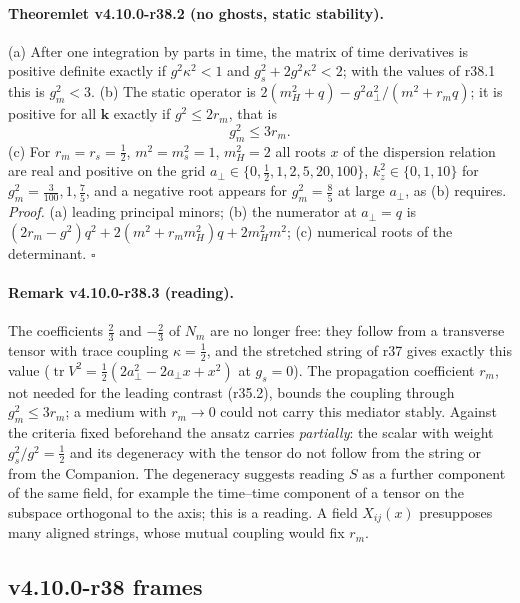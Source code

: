 \paragraph{Theoremlet v4.10.0-r38.2 (no ghosts, static stability).}
(a) After one integration by parts in time, the matrix of time derivatives is positive definite exactly if \(g^2\kappa^2<1\) and
\(g_s^2+2g^2\kappa^2<2\); with the values of r38.1 this is \(g_m^2<3\).
(b) The static operator is \(2(m_H^2+q)-g^2a_\perp^2/(m^2+r_mq)\); it is positive for all \(\mathbf k\) exactly if \(g^2\le2r_m\), that is
\[
 g_m^2\le3r_m .
\]
(c) For \(r_m=r_s=\tfrac12\), \(m^2=m_s^2=1\), \(m_H^2=2\) all roots \(x\) of the dispersion relation are real and positive on the grid
\(a_\perp\in\{0,\tfrac12,1,2,5,20,100\}\), \(k_z^2\in\{0,1,10\}\) for \(g_m^2=\tfrac3{100},1,\tfrac75\), and a negative root appears for \(g_m^2=\tfrac85\) at large
\(a_\perp\), as (b) requires.  \emph{Proof.} (a) leading principal minors; (b) the numerator at \(a_\perp=q\) is
\((2r_m-g^2)q^2+2(m^2+r_mm_H^2)q+2m_H^2m^2\); (c) numerical roots of the determinant.  \(\square\)

\paragraph{Remark v4.10.0-r38.3 (reading).}
The coefficients \(\tfrac23\) and \(-\tfrac23\) of \(N_m\) are no longer free: they follow from a transverse tensor with trace coupling \(\kappa=\tfrac12\), and
the stretched string of r37 gives exactly this value (\(\operatorname{tr}V^2=\tfrac12(2a_\perp^2-2a_\perp x+x^2)\) at \(g_s=0\)).  The propagation
coefficient \(r_m\), not needed for the leading contrast (r35.2), bounds the coupling through \(g_m^2\le3r_m\); a medium with \(r_m\to0\) could not
carry this mediator stably.  Against the criteria fixed beforehand the ansatz carries \emph{partially}: the scalar with weight \(g_s^2/g^2=\tfrac12\)
and its degeneracy with the tensor do not follow from the string or from the Companion.  The degeneracy suggests reading \(S\) as a further
component of the same field, for example the time--time component of a tensor on the subspace orthogonal to the axis; this is a reading.  A
field \(X_{ij}(x)\) presupposes many aligned strings, whose mutual coupling would fix \(r_m\).

\subsection*{v4.10.0-r38 frames}
\label{subsec:v4100-r38-frames}

